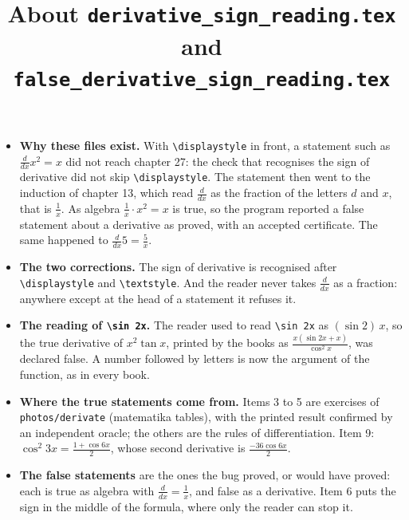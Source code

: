 \documentclass[11pt,a4paper]{article}
\title{About \texttt{derivative\_sign\_reading.tex} and \texttt{false\_derivative\_sign\_reading.tex}}
\author{}
\date{}
\begin{document}
\maketitle
\begin{itemize}
\item \textbf{Why these files exist.} With \verb|\displaystyle| in front, a statement such as $\frac{d}{dx} x^{2} = x$ did not reach chapter 27: the check that recognises the sign of derivative did not skip \verb|\displaystyle|. The statement then went to the induction of chapter 13, which read $\frac{d}{dx}$ as the fraction of the letters $d$ and $x$, that is $\frac{1}{x}$. As algebra $\frac{1}{x} \cdot x^{2} = x$ is true, so the program reported a false statement about a derivative as proved, with an accepted certificate. The same happened to $\frac{d}{dx} 5 = \frac{5}{x}$.
\item \textbf{The two corrections.} The sign of derivative is recognised after \verb|\displaystyle| and \verb|\textstyle|. And the reader never takes $\frac{d}{dx}$ as a fraction: anywhere except at the head of a statement it refuses it.
\item \textbf{The reading of \texttt{\textbackslash sin 2x}.} The reader used to read \verb|\sin 2x| as $(\sin 2)\,x$, so the true derivative of $x^{2} \tan x$, printed by the books as $\frac{x(\sin 2x + x)}{\cos^{2} x}$, was declared false. A number followed by letters is now the argument of the function, as in every book.
\item \textbf{Where the true statements come from.} Items 3 to 5 are exercises of \texttt{photos/derivate} (matematika tables), with the printed result confirmed by an independent oracle; the others are the rules of differentiation. Item 9: $\cos^{2} 3x = \frac{1 + \cos 6x}{2}$, whose second derivative is $\frac{-36 \cos 6x}{2}$.
\item \textbf{The false statements} are the ones the bug proved, or would have proved: each is true as algebra with $\frac{d}{dx} = \frac{1}{x}$, and false as a derivative. Item 6 puts the sign in the middle of the formula, where only the reader can stop it.
\end{itemize}
\end{document}
